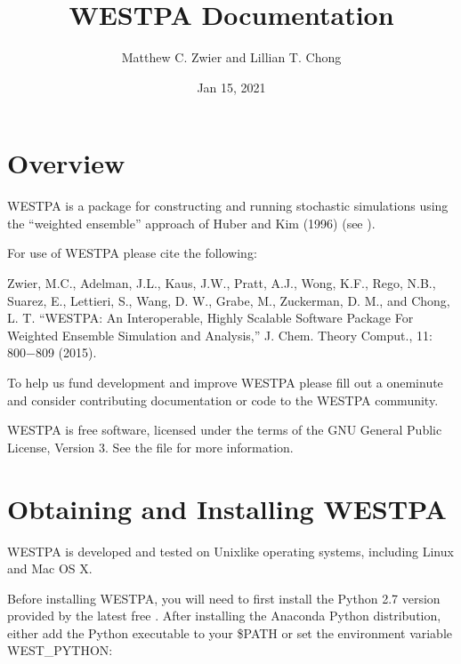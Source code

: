 \documentclass[letterpaper,10pt,english]{sphinxmanual}
\title{WESTPA Documentation}
\date{Jan 15, 2021}
\author{Matthew C. Zwier and Lillian T. Chong}
\begin{document}
\pagestyle{empty}
\sphinxmaketitle
\pagestyle{plain}
\sphinxtableofcontents
\pagestyle{normal}
\label{\detokenize{sphinx_index::doc}}



\chapter{Overview}
\label{\detokenize{sphinx_index:overview}}
WESTPA is a package for constructing and running stochastic simulations using the “weighted ensemble” approach
of Huber and Kim (1996) (see ).

For use of WESTPA please cite the following:

Zwier, M.C., Adelman, J.L., Kaus, J.W., Pratt, A.J., Wong, K.F., Rego, N.B., Suarez, E., Lettieri, S.,
Wang, D. W., Grabe, M., Zuckerman, D. M., and Chong, L. T. “WESTPA: An Interoperable, Highly
Scalable Software Package For Weighted Ensemble Simulation and Analysis,” J. Chem. Theory Comput., 11: 800−809 (2015).

To help us fund development and improve WESTPA please fill out a one\sphinxhyphen{}minute  and consider
contributing documentation or code to the WESTPA community.

WESTPA is free software, licensed under the terms of the GNU General Public
License, Version 3. See the file  for more information.


\chapter{Obtaining and Installing WESTPA}
\label{\detokenize{sphinx_index:obtaining-and-installing-westpa}}
WESTPA is developed and tested on Unix\sphinxhyphen{}like operating systems, including Linux and Mac OS X.

Before installing WESTPA, you will need to first install the Python 2.7 version provided by the latest free . After installing the Anaconda Python distribution, either add the Python executable to your \$PATH or set the environment variable WEST\_PYTHON:

\begin{sphinxVerbatim}[commandchars=\\\{\}]
 
\end{sphinxVerbatim}
\end{document}
